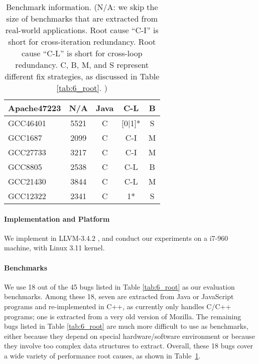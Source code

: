\begin{table}
\begin{tabular}{lcccc}
   Apache47223           & N/A             & Java                   &  C-L         & B \\
   \midrule
   GCC46401              & 5521            & C                      &  [0$|$1]*    & S   \\
   GCC1687               & 2099            & C                      &  C-I         & M \\
   GCC27733              & 3217            & C                      &  C-I         & M \\
   GCC8805               & 2538            & C                      &  C-L         & B\\
   GCC21430              & 3844            & C                      &  C-L         & M \\
   GCC12322              & 2341            & C                      &  1*          & S\\
\bottomrule
   \end{tabular}
  \caption{Benchmark information.
  (N/A: we skip the size of benchmarks that are extracted from real-world applications.
  Root cause ``C-I'' is short for cross-iteration redundancy.
  Root cause ``C-L'' is short for cross-loop redundancy.
  C, B, M, and S represent different fix strategies, as discussed in
  Table \ref{tab:6_root}.
  ) 
 }
  \label{tab:6_benchmarks}
\end{table}

\paragraph{Implementation and Platform}
We implement \Tool in LLVM-3.4.2 \citep{llvm}, and conduct our
experiments on a i7-960 machine, with Linux 3.11 kernel. 

\paragraph{Benchmarks}
We use 18 out of the 45 bugs listed in Table \ref{tab:6_root} as our 
evaluation benchmarks. Among these 18, seven are extracted from Java or JavaScript
programs and re-implemented in C++, as \Tool currently only handles C/C++
programs; one is extracted from a very old version of Mozilla.
The remaining bugs listed in Table \ref{tab:6_root} are much more difficult to
use as benchmarks, 
either because they depend on special hardware/software environment
or because they involve too complex data structures to extract. 
Overall, these 18 bugs cover a wide variety of performance root causes, as 
shown in Table~\ref{tab:6_benchmarks}. 

